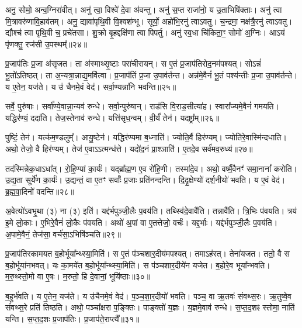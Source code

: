 अनु॒ सोमो॒ अन्व॒ग्निरा॑वीत्।
अनु॑ त्वा॒ विश्वे॑ दे॒वा अ॑वन्तु।
अनु॑ स॒प्त राजा॑नो॒ य उ॒ताभिषि॑क्ताः।
अनु॑ त्वा मि॒त्रावरु॑णावि॒हाव॑तम्।
अनु॒ द्यावा॑पृथि॒वी वि॒श्वश॑म्भू।
सूर्यो॒ अहो॑भि॒रनु॑\- त्वाऽवतु।
च॒न्द्रमा॒ नक्ष॑त्रै॒रनु॑\- त्वाऽवतु।
द्यौश्च॑ त्वा पृथि॒वी च॒ प्रचे॑तसा।
शु॒क्रो बृ॒हद्दक्षि॑णा त्वा पिपर्तु।
अनु॑ स्व॒धा चि॑किता॒ꣳ॒ सोमो॑ अ॒ग्निः।
आऽयं पृ॑णक्तु॒ रज॑सी उ॒पस्थम्᳚॥२४॥\ip\anuvakamend[बृह॒स्पतिः॒ सोमो॑ अ॒ग्निरेकं॑ च]

प्र॒जा\-प॑तिः प्र॒जा अ॑\-सृजत।
ता अ॑स्माथ्सृ॒ष्टाः परा॑चीरायन्।
स ए॒तं प्र॒जा\-प॑तिरोद॒नम॑पश्यत्।
सोऽन्नं॑ भू॒तो॑\-ऽतिष्ठत्।
ता अ॒न्यत्रा॒न्नाद्य॒मवि॑त्वा।
प्र॒जा\-प॑तिं प्र॒जा उ॒पाव॑र्तन्त।
अन्न॑मे॒वैनं॑ भू॒तं पश्य॑न्तीः प्र॒जा उ॒पाव॑र्तन्ते।
य ए॒तेन॒ यज॑ते।
य उ॑ चैनमे॒वं वेद॑।
सर्वा॒ण्यन्ना॑नि भवन्ति॥२५॥\ip

सर्वे॒ पुरु॑षाः।
सर्वा᳚ण्ये॒वान्ना॒न्यव॑ रुन्धे।
सर्वा॒न्पुरु॑षान्।
राड॑सि वि॒राड॒सीत्या॑ह।
स्वारा᳚ज्यमे॒वैनं॑ गमयति।
यद्धिर॑ण्यं॒ ददा॑ति।
तेज॒स्तेनाव॑ रुन्धे।
यत्ति॑सृध॒न्वम्।
वी॒र्यं॑ तेन॑।
यदष्ट्रा᳚म्॥२६॥\ip

पुष्टिं॒ तेन॑।
यत्क॑म॒ण्डलुम्᳚।
आयु॒ष्टेन॑।
यद्धिर॑ण्यमा ब॒ध्नाति॑।
ज्योति॒र्वै हिर॑ण्यम्।
ज्योति॑रे॒वास्मि॑न्दधाति।
अथो॒ तेजो॒ वै हिर॑ण्यम्।
तेज॑ ए॒वाऽऽत्मन्ध॑त्ते।
यदो॑द॒नं प्रा॒श्ञाति॑।
ए॒तदे॒व सर्व॑मव॒रुध्य॑॥२७॥\ip

तद॑स्मिन्नेक॒धा\-ऽधा᳚त्।
रो॒हि॒ण्यां का॒र्यः॑।
यद्ब्रा᳚ह्म॒ण ए॒व रो॑हि॒णी।
तस्मा॑दे॒व।
अथो॒ वर्ष्मै॒वैनꣳ॑ समा॒नानां᳚ करोति।
उ॒द्य॒ता सूर्ये॑ण का॒र्यः॑।
उ॒द्यन्तं॒ वा ए॒तꣳ सर्वाः᳚ प्र॒जाः प्रति॑\-नन्दन्ति।
दि॒दृ॒क्षेण्यो॑ दर्\mbox{}श॒नीयो॑ भवति।
य ए॒वं वेद॑।
ब्र॒ह्म॒वा॒दिनो॑ वदन्ति॥२८॥\ip

अ॒वेत्यो॑\-ऽवभृ॒था (३) ना (३) इति॑।
यद्द॑र्भपुञ्जी॒लैः प॒वय॑ति।
तथ्स्वि॑दे॒वावै॑ति।
तन्नावै॑ति।
त्रि॒भिः प॑वयति।
त्रय॑ इ॒मे लो॒काः।
ए॒भिरे॒वैनं॑ लो॒कैः प॑वयति।
अथो॑ अ॒पां वा ए॒तत्तेजो॒ वर्चः॑।
यद्द॒र्भाः।
यद्द॑र्भपुञ्जी॒लैः प॒वय॑ति।
अ॒पामे॒वैनं॒ तेज॑सा॒ वर्च॑सा॒\-ऽभिषि॑ञ्चति॥२९॥\ip\anuvakamend[भ॒व॒न्त्यष्ट्रा॑मव॒रुध्य॑ वदन्ति द॒र्भा यद्द॑र्भपुञ्जी॒लैः प॒वय॒त्येकं॑ च]

प्र॒जा\-प॑तिरकामयत ब॒होर्भूया᳚न्थ्स्या॒मिति॑।
स ए॒तं प॑ञ्चशार॒दीय॑मपश्यत्।
तमाऽह॑रत्।
तेना॑यजत।
ततो॒ वै स ब॒होर्भूया॑नभवत्।
यः का॒मये॑त ब॒होर्भूया᳚न्थ्स्या॒मिति॑।
स प॑ञ्चशार॒दीये॑न यजेत।
ब॒होरे॒व भूया᳚न्भवति।
म॒रु॒थ्स्तो॒मो वा ए॒षः।
म॒रुतो॒ हि दे॒वानां॒ भूयि॑ष्ठाः॥३०॥\ip

ब॒हुर्भ॑वति।
य ए॒तेन॒ यज॑ते।
य उ॑चैनमे॒वं वेद॑।
प॒ञ्च॒शा॒र॒दीयो॑ भवति।
पञ्च॒ वा ऋ॒तवः॑ संवथ्स॒रः।
ऋ॒तुष्वे॒व सं॑वथ्स॒रे प्रति॑ तिष्ठति।
अथो॒ पञ्चा᳚क्षरा प॒ङ्क्तिः।
पाङ्क्तो॑ य॒ज्ञः।
य॒ज्ञमे॒वाव॑ रुन्धे।
स॒प्त॒द॒शꣴ स्तोमा॒ नाति॑ यन्ति।
स॒प्त॒द॒शः प्र॒जा\-प॑तिः।
प्र॒जा\-प॑ते॒राप्त्यै᳚॥३१॥\ip\anuvakamend[भूयि॑ष्ठा यन्ति॒ द्वे च॑]


